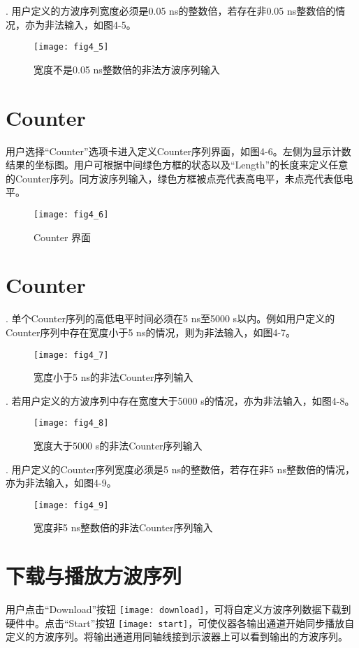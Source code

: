. 用户定义的方波序列宽度必须是0.05 ns的整数倍，若存在非0.05 ns整数倍的情况，亦为非法输入，如图4-5。
\begin{figure}[H]
\centering
\texttt{[image: fig4\_5]}
\caption{宽度不是0.05 ns整数倍的非法方波序列输入}
\end{figure}

\section{Counter}
用户选择“Counter”选项卡进入定义Counter序列界面，如图4-6。左侧为显示计数结果的坐标图。用户可根据中间绿色方框的状态以及“Length”的长度来定义任意的Counter序列。同方波序列输入，绿色方框被点亮代表高电平，未点亮代表低电平。
\begin{figure}[ht]
\centering
\texttt{[image: fig4\_6]}
\caption{Counter 界面}
\end{figure}

\section{Counter}
. 单个Counter序列的高低电平时间必须在5 ns至5000 s以内。例如用户定义的Counter序列中存在宽度小于5 ns的情况，则为非法输入，如图4-7。
\begin{figure}[ht]
\centering
\texttt{[image: fig4\_7]}
\caption{宽度小于5 ns的非法Counter序列输入}
\end{figure}

\newpage
{}. 若用户定义的方波序列中存在宽度大于5000 s的情况，亦为非法输入，如图4-8。
\begin{figure}[ht]
\centering
\texttt{[image: fig4\_8]}
\caption{宽度大于5000 s的非法Counter序列输入}
\end{figure}

. 用户定义的Counter序列宽度必须是5 ns的整数倍，若存在非5 ns整数倍的情况，亦为非法输入，如图4-9。
\begin{figure}[ht]
\centering
\texttt{[image: fig4\_9]}
\caption{宽度非5 ns整数倍的非法Counter序列输入}
\end{figure}

\section{\heiti 下载与播放方波序列}
用户点击“Download”按钮
\texttt{[image: download]}，可将自定义方波序列数据下载到硬件中。点击“Start”按钮
\texttt{[image: start]}，可使仪器各输出通道开始同步播放自定义的方波序列。将输出通道用同轴线接到示波器上可以看到输出的方波序列。

